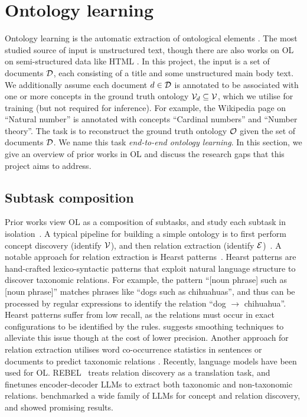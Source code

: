 \section{Ontology learning}  \label{sec:ontology-learning}

Ontology learning is the automatic extraction of ontological elements \cite{hazman2011survey}. The most studied source of input is unstructured text, though there are also works on OL on semi-structured data like HTML \cite{karoui2004ontology}. In this project, the input is a set of documents $\mathcal{D}$, each consisting of a title and some unstructured main body text. We additionally assume each document $d \in \mathcal{D}$ is annotated to be associated with one or more concepts in the ground truth ontology $\mathcal{V}_{d} \subseteq \mathcal{V}$, which we utilise for training (but not required for inference). For example, the Wikipedia page on ``Natural number'' is annotated with concepts ``Cardinal numbers'' and ``Number theory''. The task is to reconstruct the ground truth ontology $\mathcal{O}$ given the set of documents $\mathcal{D}$. We name this task \emph{end-to-end ontology learning}. In this section, we give an overview of prior works in OL and discuss the research gaps that this project aims to address.

\subsection{Subtask composition}

Prior works view OL as a composition of subtasks, and study each subtask in isolation~\cite{buitelaar2005ontology,asim2018survey}. A typical pipeline for building a simple ontology is to first perform concept discovery (identify $\mathcal{V}$), and then relation extraction (identify $\mathcal{E}$)~\cite{cimiano2005text2onto,kaushik2018automatic}. A notable approach for relation extraction is Hearst patterns~\cite{hearst1998automated}. Hearst patterns are hand-crafted lexico-syntactic patterns that exploit natural language structure to discover taxonomic relations. For example, the pattern ``[noun phrase] such as [noun phrase]'' matches phrases like ``dogs such as chihuahuas'', and thus can be processed by regular expressions to identify the relation ``dog $\to$ chihuahua''. Hearst patterns suffer from low recall, as the relations must occur in exact configurations to be identified by the rules. \citet{roller2018hearst} suggests smoothing techniques to alleviate this issue though at the cost of lower precision. Another approach for relation extraction utilises word co-occurrence statistics in sentences or documents to predict taxonomic relations \cite{cimiano2005learning}. Recently, language models have been used for OL. REBEL~\cite{cabot2021rebel} treats relation discovery as a translation task, and finetunes encoder-decoder LLMs to extract both taxonomic and non-taxonomic relations. \citet{babaei2023llms4ol} benchmarked a wide family of LLMs for concept and relation discovery, and showed promising results.

